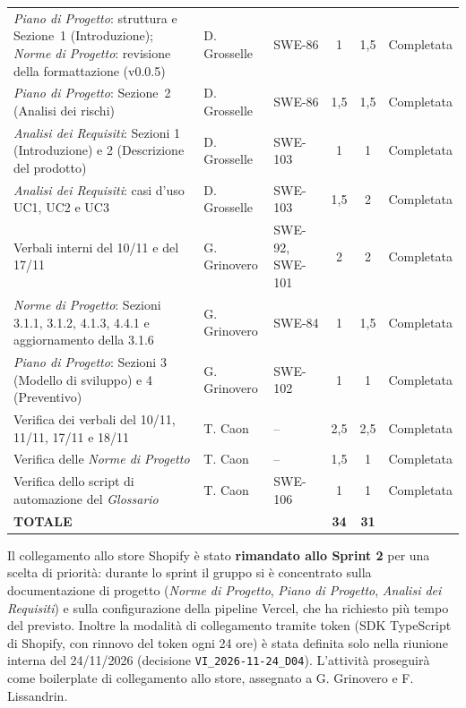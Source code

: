 {\begin{xltabular}{\textwidth}{|>{\raggedright\arraybackslash}X >{\raggedright\arraybackslash}p{2.3cm} >{\raggedright\arraybackslash}p{1.6cm} c c c|}
\textit{Piano di Progetto}: struttura e Sezione~1 (Introduzione); \textit{Norme di Progetto}: revisione della formattazione (v0.0.5) & D. Grosselle & SWE-86 & 1 & 1,5 & Completata \\
\textit{Piano di Progetto}: Sezione~2 (Analisi dei rischi) & D. Grosselle & SWE-86 & 1,5 & 1,5 & Completata \\
\textit{Analisi dei Requisiti}: Sezioni 1 (Introduzione) e 2 (Descrizione del prodotto) & D. Grosselle & SWE-103 & 1 & 1 & Completata \\
\textit{Analisi dei Requisiti}: casi d'uso UC1, UC2 e UC3 & D. Grosselle & SWE-103 & 1,5 & 2 & Completata \\
Verbali interni del 10/11 e del 17/11 & G. Grinovero & SWE-92, SWE-101 & 2 & 2 & Completata \\
\textit{Norme di Progetto}: Sezioni 3.1.1, 3.1.2, 4.1.3, 4.4.1 e aggiornamento della 3.1.6 & G. Grinovero & SWE-84 & 1 & 1,5 & Completata \\
\textit{Piano di Progetto}: Sezioni 3 (Modello di sviluppo) e 4 (Preventivo) & G. Grinovero & SWE-102 & 1 & 1 & Completata \\
Verifica dei verbali del 10/11, 11/11, 17/11 e 18/11 & T. Caon & -- & 2,5 & 2,5 & Completata \\
Verifica delle \textit{Norme di Progetto} & T. Caon & -- & 1,5 & 1 & Completata \\
Verifica dello script di automazione del \textit{Glossario} & T. Caon & SWE-106 & 1 & 1 & Completata \\
\hline
\textbf{TOTALE} & & & \textbf{34} & \textbf{31} & \\
\end{xltabular}}

\noindent
Il collegamento allo store Shopify è stato \textbf{rimandato allo Sprint 2} per una scelta di priorità: durante lo sprint il gruppo si è concentrato sulla documentazione di progetto (\textit{Norme di Progetto}, \textit{Piano di Progetto}, \textit{Analisi dei Requisiti}) e sulla configurazione della pipeline Vercel, che ha richiesto più tempo del previsto. Inoltre la modalità di collegamento tramite token (SDK TypeScript di Shopify, con rinnovo del token ogni 24 ore) è stata definita solo nella riunione interna del 24/11/2026 (decisione \texttt{VI\_2026-11-24\_D04}). L'attività proseguirà come boilerplate di collegamento allo store, assegnato a G. Grinovero e F. Lissandrin.

